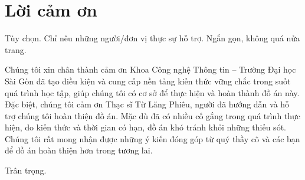 \chapter*{Lời cảm ơn}
\begin{huongdan}
Tùy chọn. Chỉ nêu những người/đơn vị thực sự hỗ trợ. Ngắn gọn, không quá nửa trang.
\end{huongdan}

Chúng tôi xin chân thành cảm ơn Khoa Công nghệ Thông tin – Trường Đại học Sài Gòn đã tạo điều kiện và cung cấp nền tảng kiến thức vững chắc trong suốt quá trình học tập, giúp chúng tôi có cơ sở để thực hiện và hoàn thành đồ án này. Đặc biệt, chúng tôi cảm ơn Thạc sĩ Từ Lăng Phiêu, người đã hướng dẫn và hỗ trợ chúng tôi hoàn thiện đồ án. Mặc dù đã có nhiều cố gắng trong quá trình thực hiện, do kiến thức và thời gian có hạn, đồ án khó tránh khỏi những thiếu sót. Chúng tôi rất mong nhận được những ý kiến đóng góp từ quý thầy cô và các bạn để đồ án hoàn thiện hơn trong tương lai.

Trân trọng.
